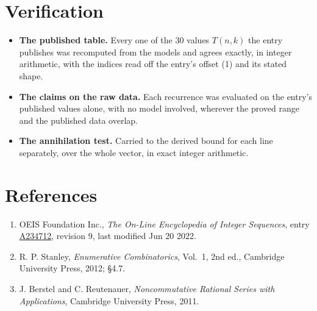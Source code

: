 \documentclass[11pt]{article}
\theoremstyle{definition}
\begin{document}
\section{Verification}

\begin{itemize}

\item {\bfseries The published table.} Every one of the 30 values $T(n,k)$ the entry publishes was recomputed from the models and agrees exactly, in integer arithmetic, with the indices read off the entry's offset (1) and its stated shape.

\item {\bfseries The claims on the raw data.} Each recurrence was evaluated on the entry's published values alone, with no model involved, wherever the proved range and the published data overlap.

\item {\bfseries The annihilation test.} Carried to the derived bound for each line separately, over the whole vector, in exact integer arithmetic.

\end{itemize}

\section{References}

\begin{enumerate}

\item OEIS Foundation Inc., \emph{The On-Line Encyclopedia of Integer Sequences}, entry \href{https://oeis.org/A234712}{A234712}, revision 9, last modified Jun 20 2022.

\item R. P. Stanley, \emph{Enumerative Combinatorics}, Vol.~1, 2nd ed., Cambridge University Press, 2012; \S4.7.

\item J. Berstel and C. Reutenauer, \emph{Noncommutative Rational Series with Applications}, Cambridge University Press, 2011.

\end{enumerate}
\end{document}
